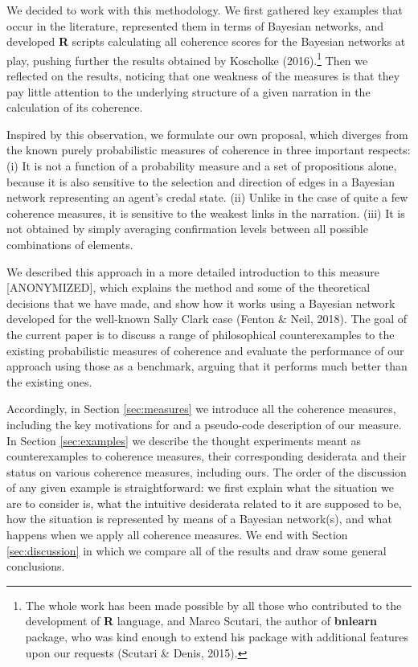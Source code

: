 \documentclass[
  10pt,
]{scrartcl}
\begin{document}
We decided to work with this methodology. We first gathered key examples that occur in the literature, represented them in terms of Bayesian networks, and developed \textbf{\textsf{R}} scripts calculating all coherence scores for the Bayesian networks at play, pushing further the results obtained by Koscholke (2016).\footnote{
  The whole work has been made possible by all those who contributed to the development of \textsf{\textbf{R}} language, and Marco Scutari, the author of \textsf{\textbf{bnlearn}} package, who was kind enough to extend his package with additional features upon our requests (Scutari \& Denis, 2015).} Then we reflected on the results, noticing that one weakness of the measures is that they pay little attention to the underlying structure of a given narration in the calculation of its coherence.

Inspired by this observation, we formulate our own proposal, which diverges from the known purely probabilistic measures of coherence in three important respects: (i) It is not a function of a probability measure and a set
of propositions alone, because it is also sensitive to the selection and direction of edges in a Bayesian network representing an agent's credal state. (ii) Unlike in the case of quite a few coherence measures, it is sensitive to
the weakest links in the narration. (iii) It is not obtained by simply averaging confirmation levels between all possible combinations of elements.

We described this approach in a more detailed introduction to this measure {[}ANONYMIZED{]}, which explains the method and some of the theoretical decisions that we have made, and show how it works using a Bayesian network developed for the well-known Sally Clark case (Fenton \& Neil, 2018). The goal of the current paper is to discuss a range of philosophical counterexamples to the existing probabilistic measures of coherence and evaluate the performance of our approach using those as a benchmark, arguing that it performs much better than the existing ones.

Accordingly, in Section \ref{sec:measures} we introduce all the coherence measures, including the key motivations for and a pseudo-code description of our measure. In Section \ref{sec:examples} we describe the thought experiments meant as counterexamples to coherence measures, their corresponding desiderata and their status on various coherence measures, including ours. The order of the discussion of any given example is straightforward: we first explain what the situation we are to consider is, what the intuitive desiderata related to it are supposed to be, how the situation is represented by means of a Bayesian network(s), and what happens when we apply all coherence measures. We end with Section \ref{sec:discussion} in which we compare all of the results and draw some general conclusions.
\end{document}
